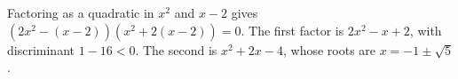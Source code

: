 Factoring as a quadratic in $x^2$ and $x-2$ gives $(2x^2-(x-2))(x^2+2(x-2))=0$. The first factor is $2x^2-x+2$, with discriminant $1-16<0$. The second is $x^2+2x-4$, whose roots are $\boxed{x=-1\pm\sqrt5}$.
